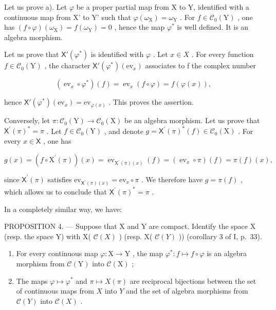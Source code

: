Let us prove a). Let \(\varphi\) be a proper partial map from X to Y, identified with a continuous map from X' to Y' such that \(\varphi(\omega_{\mathrm{X}}) = \omega_{\mathrm{Y}}\) . For \(f \in \mathcal{C}_0(\mathrm{Y})\) , one has \((f \circ \varphi)(\omega_{\mathrm{X}}) = f(\omega_{\mathrm{Y}}) = 0\) , hence the map \(\varphi^*\) is well defined. It is an algebra morphism.

Let us prove that \(\mathsf{X}'(\varphi^{*})\) is identified with \(\varphi\) . Let \(x \in X\) . For every function \(f \in \mathcal{C}_{0}(\mathrm{Y})\) , the character \(\mathsf{X}'(\varphi^{*})(\mathrm{ev}_{x})\) associates to f the complex number

\[
\left(\operatorname{ev} _ {x} \circ \varphi^ {*}\right) (f) = \operatorname{ev} _ {x} (f \circ \varphi) = f (\varphi (x)),
\]

hence \(\mathsf{X}'(\varphi^{*})(\mathrm{ev}_{x}) = \mathrm{ev}_{\varphi(x)}\) . This proves the assertion.

Conversely, let \(\pi\colon\mathcal{C}_{0}(\mathrm{Y})\to\mathcal{C}_{0}(\mathrm{X})\) be an algebra morphism. Let us prove that \(\mathsf{X}^{\prime}(\pi)^{*}=\pi\) . Let \(f\in\mathcal{C}_{0}(\mathrm{Y})\) , and denote \(g=\mathsf{X}^{\prime}(\pi)^{*}(f)\in\mathcal{C}_{0}(\mathrm{X})\) . For every \(x\in\mathsf{X}\) , one has

\[
g (x) = \left(f \circ \mathrm{X} ^ {\prime} (\pi)\right) (x) = \operatorname{ev} _ {\mathrm{X} ^ {\prime} (\pi) (x)} (f) = \left(\operatorname{ev} _ {x} \circ \pi\right) (f) = \pi (f) (x),
\]

since \(\mathsf{X}^{\prime}(\pi)\) satisfies \(\mathrm{ev}_{\mathsf{X}^{\prime}(\pi)(x)} = \mathrm{ev}_{x} \circ \pi\) . We therefore have \(g = \pi(f)\) , which allows us to conclude that \(\mathsf{X}^{\prime}(\pi)^{*} = \pi\) .

In a completely similar way, we have:

PROPOSITION 4. --- Suppose that X and Y are compact. Identify the space X (resp. the space Y) with X( \(\mathcal{C}(X)\) ) (resp. X( \(\mathcal{C}(Y)\) )) (corollary 3 of I, p.~33).

\begin{enumerate}
\def\labelenumi{\alph{enumi})}
\item
  For every continuous map \(\varphi\colon\mathrm{X}\to\mathrm{Y}\) , the map \(\varphi^{*}\colon f\mapsto f\circ\varphi\) is an algebra morphism from \(\mathcal{C}(\mathrm{Y})\) into \(\mathcal{C}(\mathrm{X})\) ;
\item
  The maps \(\varphi \mapsto \varphi^{*}\) and \(\pi \mapsto X(\pi)\) are reciprocal bijections between the set of continuous maps from \(X\) into \(Y\) and the set of algebra morphisms from \(\mathcal{C}(Y)\) into \(\mathcal{C}(X)\) .
\end{enumerate}

